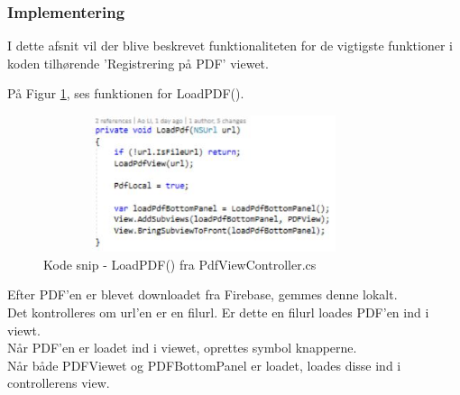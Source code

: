 \clearpage

\subsubsection{Implementering}
I dette afsnit vil der blive beskrevet funktionaliteten for de vigtigste funktioner i koden tilhørende 'Registrering på PDF' viewet.

På Figur \ref{fig:LoadPDF}, ses funktionen for LoadPDF().
\begin{figure}[H] %
	\centering
	\includegraphics[height=4cm, width=10cm]{../ArkitekturDesign/Design/RegisterPDF/LoadPDF}
	\caption{Kode snip - LoadPDF() fra PdfViewController.cs}
	\label{fig:LoadPDF}
\end{figure}
Efter PDF'en er blevet downloadet fra Firebase, gemmes denne lokalt. \\
Det kontrolleres om url'en er en filurl. Er dette en filurl loades PDF'en ind i viewt. \\
Når PDF'en er loadet ind i viewet, oprettes symbol knapperne. \\
Når både PDFViewet og PDFBottomPanel er loadet, loades disse ind i controllerens view.

\clearpage

